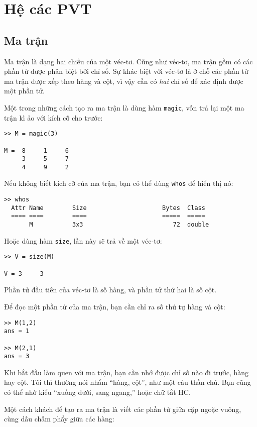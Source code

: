 \documentclass[12pt]{book}
\begin{document}
\chapter{Hệ các PVT}

\section{Ma trận}

Ma trận là dạng hai chiều của một véc-tơ. Cũng như véc-tơ, ma trận
gồm có các phần tử được phân biệt bởi chỉ số. Sự khác biệt với
véc-tơ là ở chỗ các phần tử ma trận được xếp theo hàng và cột, 
vì vậy cần có {\em hai} chỉ số để xác định được một phần tử.

Một trong những cách tạo ra ma trận là dùng hàm {\tt magic},
vốn trả lại một ma trận kì ảo với kích cỡ cho trước:

\begin{verbatim}
>> M = magic(3)

M =  8     1     6
     3     5     7
     4     9     2
\end{verbatim}
%
Nếu không biết kích cỡ của ma trận, bạn có thể dùng {\tt whos} 
để hiển thị nó:

\begin{verbatim}
>> whos
  Attr Name        Size                     Bytes  Class
  ==== ====        ====                     =====  =====
       M           3x3                         72  double
\end{verbatim}
%
Hoặc dùng hàm {\tt size}, lần này sẽ trả về một véc-tơ:

\begin{verbatim}
>> V = size(M)

V = 3     3
\end{verbatim}
%
Phần tử đầu tiên của véc-tơ là số hàng, và phần tử thứ hai là số cột.

Để đọc một phần tử của ma trận, bạn cần chỉ ra số thứ tự hàng và cột:

\begin{verbatim}
>> M(1,2)
ans = 1

>> M(2,1)
ans = 3
\end{verbatim}
%
Khi bắt đầu làm quen với ma trận, bạn cần nhớ được chỉ số nào
đi trước, hàng hay cột. Tôi thì thường nói nhẩm ``hàng, cột'',
như một câu thần chú. Bạn cũng có thể nhớ kiểu 
``xuống dưới, sang ngang,'' hoặc chữ tắt HC.

Một cách khách để tạo ra ma trận là viết các phần tử giữa cặp
ngoặc vuông, cùng dấu chấm phẩy giữa các hàng:
\end{document}
